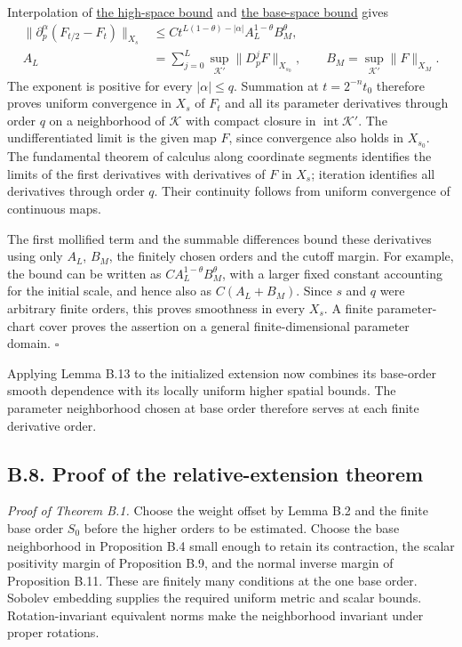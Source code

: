 \documentclass[
  english,
  11pt,
  reqno]{amsart}
\makeatletter
\newcommand{\paperdisplaynext}{%
  \let\paper@savedstartsection\@startsection
  \def\@startsection##1##2##3##4##5##6{%
    \let\@startsection\paper@savedstartsection
    \@tempskipa ##5\relax
    \ifdim\@tempskipa<\z@
      \def\paper@afterskip{.35\baselineskip}%
    \else
      \def\paper@afterskip{##5}%
    \fi
    \@startsection{##1}{##2}{##3}{##4}{\paper@afterskip}{##6}}}
\newcommand{\paperdisplaysection}{\paperdisplaynext\subsection}
\let\paper@displaysection\paperdisplaysection
\renewcommand{\paperdisplaysection}[1]{%
  \let\paper@savedhangfrom\@hangfrom
  \long\def\@hangfrom##1##2{%
    \paper@savedhangfrom{##1}{\paper@headingparagraph##2}}%
  \paper@displaysection{#1}%
  \let\@hangfrom\paper@savedhangfrom}
\makeatother
\begin{document}
Interpolation of \hyperref[eq:online-parameter-high-mollifier-bound]{the
high-space bound} and
\hyperref[eq:online-parameter-base-mollifier-bound]{the base-space
bound} gives%
 \[
\begin{aligned}
\|\partial_p^\alpha(F_{t/2}-F_t)\|_{X_s}
 &\le C t^{L(1-\theta)-|\alpha|}
       A_L^{1-\theta}B_M^\theta,\\
A_L&=\sum_{j=0}^L\sup_{\mathcal K'}
                              \|D_p^jF\|_{X_{s_0}},\qquad
B_M=\sup_{\mathcal K'}\|F\|_{X_M}.
\end{aligned}
\] The exponent is positive for every \(|\alpha|\le q\). Summation at
\(t=2^{-n}t_0\) therefore proves uniform convergence in \(X_s\) of
\(F_t\) and all its parameter derivatives through order \(q\) on a
neighborhood of \(\mathcal K\) with compact closure in
\(\operatorname{int}\mathcal K'\). The undifferentiated limit is the
given map \(F\), since convergence also holds in \(X_{s_0}\). The
fundamental theorem of calculus along coordinate segments identifies the
limits of the first derivatives with derivatives of \(F\) in \(X_s\);
iteration identifies all derivatives through order \(q\). Their
continuity follows from uniform convergence of continuous maps.

The first mollified term and the summable differences bound these
derivatives using only \(A_L\), \(B_M\), the finitely chosen orders and
the cutoff margin. For example, the bound can be written as
\(C A_L^{1-\theta}B_M^\theta\), with a larger fixed constant accounting
for the initial scale, and hence also as \(C(A_L+B_M)\). Since \(s\) and
\(q\) were arbitrary finite orders, this proves smoothness in every
\(X_s\). A finite parameter-chart cover proves the assertion on a
general finite-dimensional parameter domain. \hfill\(\square\)

Applying Lemma B.13 to the initialized extension now combines its
base-order smooth dependence with its locally uniform higher spatial
bounds. The parameter neighborhood chosen at base order therefore serves
at each finite derivative order.

\paperdisplaysection{B.8. Proof of the relative-extension
theorem}\label{b.8.-proof-of-the-relative-extension-theorem}\label{sec:online-extension-proof-of-smooth-theorem}

\emph{Proof of Theorem B.1.} Choose the weight offset by Lemma B.2 and
the finite base order \(S_0\) before the higher orders to be estimated.
Choose the base neighborhood in Proposition B.4 small enough to retain
its contraction, the scalar positivity margin of Proposition B.9, and
the normal inverse margin of Proposition B.11. These are finitely many
conditions at the one base order. Sobolev embedding supplies the
required uniform metric and scalar bounds. Rotation-invariant equivalent
norms make the neighborhood invariant under proper rotations.
\end{document}
